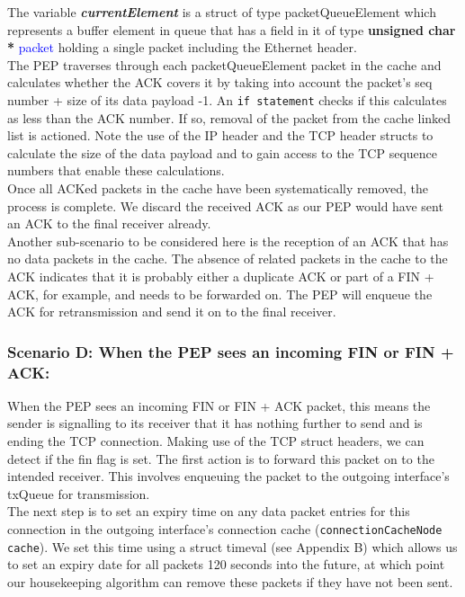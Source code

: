 \documentclass{uathesis}
\begin{document}
The variable \textbf{\emph{currentElement}} is a struct of type packetQueueElement which represents a buffer element in queue that has a field in it of type \textbf{unsigned char *} \textcolor{blue}{packet} holding a single packet including the Ethernet header. \\

The PEP traverses through each packetQueueElement packet in the cache and calculates whether the ACK covers it by taking into account the packet's seq number + size of its data payload -1. An {\tt if statement} checks if this calculates as less than the ACK number. If so, removal of the packet from the cache linked list is actioned. Note the use of the IP header and the TCP header structs to calculate the size of the data payload and to gain access to the TCP sequence numbers that enable these calculations. \\

Once all ACKed packets in the cache have been systematically removed, the process is complete. We discard the received ACK as our PEP would have sent an ACK to the final receiver already. \\

Another sub-scenario to be considered here is the reception of an ACK that has no data packets in the cache. The absence of related packets in the cache to the ACK indicates that it is probably either a duplicate ACK or part of a FIN + ACK, for example, and needs to be forwarded on. The PEP will enqueue the ACK for retransmission and send it on to the final receiver.


\subsubsection{Scenario D: When the PEP sees an incoming FIN or FIN + ACK:}

When the PEP sees an incoming FIN or FIN + ACK packet, this means the sender is signalling to its receiver that it has nothing further to send and is ending the TCP connection. Making use of the TCP struct headers, we can detect if the fin flag is set. The first action is to forward this packet on to the intended receiver. This involves enqueuing the packet to the outgoing interface's txQueue for transmission.\\

The next step is to set an expiry time on any data packet entries for this connection in the outgoing interface's connection cache ({\tt connectionCacheNode cache}). We set this time using  a struct timeval (see Appendix B) which allows us to set an expiry date for all packets 120 seconds into the future, at which point our housekeeping algorithm can remove these packets if they have not been sent. \\
\end{document}
